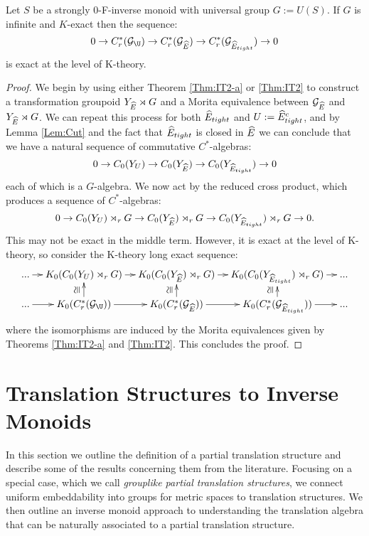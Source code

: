 \begin{corollary}
\begin{theorem}\label{thm:PV2}
Let $S$ be a strongly $0$-F-inverse monoid with universal group $G:=U(S)$. If $G$ is infinite and $K$-exact then the sequence:
\begin{equation*}
0 \rightarrow C^{*}_{r}(\G_{\U}) \rightarrow C^{*}_{r}(\G_{\E}) \rightarrow C^{*}_{r}(\G_{\E_{tight}}) \rightarrow 0
\end{equation*}
is exact at the level of K-theory.  
\end{theorem}
\begin{proof}
We begin by using either Theorem \ref{Thm:IT2-a} or \ref{Thm:IT2} to construct a transformation groupoid $Y_{\widehat{E}}\rtimes G$ and a Morita equivalence between $\mathcal{G}_{\widehat{E}}$ and $Y_{\widehat{E}}\rtimes G$. We can repeat this process for both $\widehat{E}_{tight}$ and $U:=\widehat{E}_{tight}^{c}$, and by Lemma \ref{Lem:Cut} and the fact that $\widehat{E}_{tight}$ is closed in $\widehat{E}$ we can conclude that we have a natural sequence of commutative $C^{*}$-algebras:
\begin{equation*}
0 \rightarrow C_{0}(Y_{U}) \rightarrow C_{0}(Y_{\widehat{E}}) \rightarrow C_{0}(Y_{\widehat{E}_{tight}}) \rightarrow 0
\end{equation*}
each of which is a $G$-algebra. We now act by the reduced cross product, which produces a sequence of $C^{*}$-algebras:
\begin{equation*}
0 \rightarrow C_{0}(Y_{U})\rtimes_{r}G \rightarrow C_{0}(Y_{\widehat{E}})\rtimes_{r}G \rightarrow C_{0}(Y_{\widehat{E}_{tight}})\rtimes_{r}G \rightarrow 0.
\end{equation*}
This may not be exact in the middle term. However, it is exact at the level of K-theory, so consider the K-theory long exact sequence:
\begin{equation*}
\xymatrix@=1em{...\ar[r] & K_{0}(C_{0}(Y_{U})\rtimes_{r} G) \ar[r]& K_{0}(C_{0}(Y_{\E})\rtimes_{r} G) \ar[r]& K_{0}(C_{0}(Y_{\E_{tight}})\rtimes_{r} G)\ar[r] & ...\\
...\ar[r] & K_{0}(C^{*}_{r}(\G_{\U})) \ar[r]\ar[u]^{\ucong}& K_{0}(C^{*}_{r}(\G_{\E})) \ar[r]\ar[u]^{\ucong}& K_{0}(C^{*}_{r}(\G_{\E_{tight}})) \ar[r]\ar[u]^{\ucong}& ...}
\end{equation*}
where the isomorphisms are induced by the Morita equivalences given by Theorems \ref{Thm:IT2-a} and \ref{Thm:IT2}. This concludes the proof.
\end{proof}


\section{Translation Structures to Inverse Monoids}
In this section we outline the definition of a partial translation structure and describe some of the results concerning them from the literature. Focusing on a special case, which we call \textit{grouplike partial translation structures}, we connect uniform embeddability into groups for metric spaces to translation structures.  We then outline an inverse monoid approach to understanding the translation algebra that can be naturally associated to a partial translation structure.


\end{corollary}
